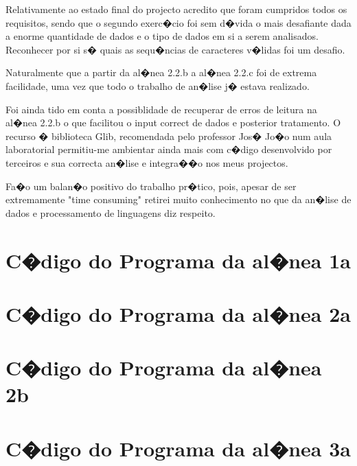 \documentclass{report}
\begin{document}
    Relativamente ao estado final do projecto acredito que foram cumpridos todos os requisitos, sendo que o segundo exerc�cio foi sem d�vida o mais desafiante dada a enorme quantidade de dados e o tipo de dados em si a serem analisados. Reconhecer por si s� quais as sequ�ncias de caracteres  v�lidas foi um desafio.\par Naturalmente que a partir da al�nea 2.2.b a al�nea 2.2.c foi de extrema facilidade, uma vez que todo o trabalho de an�lise j� estava realizado. \par 
      Foi ainda tido em conta a possiblidade de recuperar de erros de leitura na al�nea 2.2.b o que facilitou o input correct de dados e posterior tratamento.
      O recurso � biblioteca Glib, recomendada pelo professor Jos� Jo�o num aula laboratorial permitiu-me ambientar ainda mais com c�digo desenvolvido por terceiros  e sua correcta an�lise e integra��o nos meus projectos.\par 
      Fa�o um balan�o positivo do trabalho pr�tico, pois, apesar de ser extremamente "time consuming" retirei muito conhecimento no que da an�lise de dados e processamento de linguagens diz respeito.

      \appendix
      \chapter{C�digo do Programa da al�nea 1a}
    \label{completo1a}

      \newpage
      \chapter{C�digo do Programa da al�nea 2a}
    \label{completo2a}

      \newpage
      \chapter{C�digo do Programa da al�nea 2b}
    \label{completo2b}


      \newpage
      \chapter{C�digo do Programa da al�nea 3a}
    \label{completo2c}



      
\end{document}
